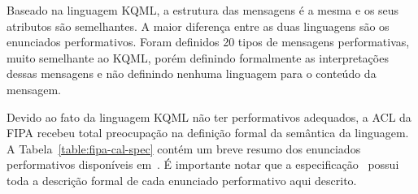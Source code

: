 Baseado na linguagem KQML, a estrutura das mensagens é a mesma e os seus atributos são semelhantes. A maior diferença entre as duas linguagens são os enunciados performativos. Foram definidos 20 tipos de mensagens performativas, muito semelhante ao KQML, porém definindo formalmente as interpretações dessas mensagens e não definindo nenhuma linguagem para o conteúdo da mensagem.

Devido ao fato da linguagem KQML não ter performativos adequados, a ACL da FIPA recebeu total preocupação na definição formal da semântica da linguagem. A Tabela~\ref{table:fipa-cal-spec} contém um breve resumo dos enunciados performativos disponíveis em~\cite{fipa-cal-spec}. É importante notar que a especificação~\cite{fipa-cal-spec} possui toda a descrição formal de cada enunciado performativo aqui descrito.

